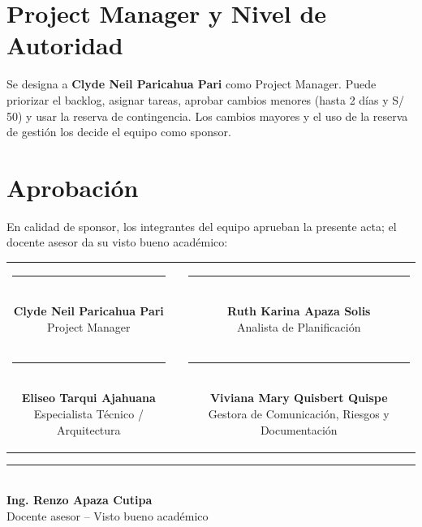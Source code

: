 \documentclass[11pt,a4paper]{article}
\begin{document}
\section{Project Manager y Nivel de Autoridad}
Se designa a \textbf{Clyde Neil Paricahua Pari} como Project Manager. Puede priorizar el backlog, asignar tareas, aprobar cambios menores (hasta 2 días y S/ 50) y usar la reserva de contingencia. Los cambios mayores y el uso de la reserva de gestión los decide el equipo como sponsor.

\section{Aprobación}
\noindent En calidad de sponsor, los integrantes del equipo aprueban la presente acta; el docente asesor da su visto bueno académico:

\vspace{1.5cm}
\begin{center}
\begin{tabular}{c c c}
    \parbox{6.5cm}{\centering \rule{6.0cm}{0.6pt}\\[5pt] \textbf{Clyde Neil Paricahua Pari}\\[2pt] {\footnotesize Project Manager}}
    & \hspace{0.8cm} &
    \parbox{6.5cm}{\centering \rule{6.0cm}{0.6pt}\\[5pt] \textbf{Ruth Karina Apaza Solis}\\[2pt] {\footnotesize Analista de Planificación}}
    \\[2.0cm]
    \parbox{6.5cm}{\centering \rule{6.0cm}{0.6pt}\\[5pt] \textbf{Eliseo Tarqui Ajahuana}\\[2pt] {\footnotesize Especialista Técnico / Arquitectura}}
    & \hspace{0.8cm} &
    \parbox{6.5cm}{\centering \rule{6.0cm}{0.6pt}\\[5pt] \textbf{Viviana Mary Quisbert Quispe}\\[2pt] {\footnotesize Gestora de Comunicación, Riesgos y Documentación}}
\end{tabular}
\end{center}

\vspace{1.2cm}
\begin{center}
\parbox{8cm}{\centering \rule{7.0cm}{0.6pt}\\[5pt] \textbf{Ing. Renzo Apaza Cutipa}\\[2pt] {\footnotesize Docente asesor -- Visto bueno académico}}
\end{center}
\end{document}
